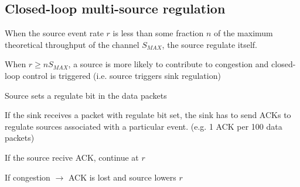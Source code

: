 \subsection{Closed-loop multi-source regulation}

When the source event rate $r$ is less than some fraction $n$ of
the maximum theoretical throughput of the channel $S_{MAX}$, the
source regulate itself.

When $r \geq nS_{MAX}$, a source is more likely to contribute to congestion and
closed-loop control is triggered (i.e. source triggers sink regulation)

\begin{description}
	\item Source sets a regulate bit in the data packets
	\item If the sink receives a packet with regulate bit set, the sink has to
		send ACKs to regulate sources associated with a particular event. (e.g.
		1 ACK per 100 data packets)
	\item If the source recive ACK, continue at $r$
	\item If congestion $\rightarrow$ ACK is lost and source lowers $r$
\end{description}


